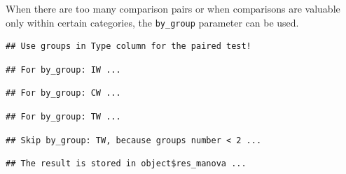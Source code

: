 \documentclass[
]{book}
\newenvironment{Shaded}{\begin{snugshade}}{\end{snugshade}}
\newcommand{\AttributeTok}[1]{\textcolor[rgb]{0.13,0.29,0.53}{#1}}
\newcommand{\ConstantTok}[1]{\textcolor[rgb]{0.56,0.35,0.01}{#1}}
\newcommand{\FunctionTok}[1]{\textcolor[rgb]{0.13,0.29,0.53}{\textbf{#1}}}
\newcommand{\NormalTok}[1]{#1}
\newcommand{\SpecialCharTok}[1]{\textcolor[rgb]{0.81,0.36,0.00}{\textbf{#1}}}
\newcommand{\StringTok}[1]{\textcolor[rgb]{0.31,0.60,0.02}{#1}}
\begin{document}
When there are too many comparison pairs or when comparisons are valuable only within certain categories, the \texttt{by\_group} parameter can be used.

\begin{Shaded}
\end{Shaded}

\begin{verbatim}
## Use groups in Type column for the paired test!
\end{verbatim}

\begin{verbatim}
## For by_group: IW ...
\end{verbatim}

\begin{verbatim}
## For by_group: CW ...
\end{verbatim}

\begin{verbatim}
## For by_group: TW ...
\end{verbatim}

\begin{verbatim}
## Skip by_group: TW, because groups number < 2 ...
\end{verbatim}

\begin{verbatim}
## The result is stored in object$res_manova ...
\end{verbatim}
\end{document}
